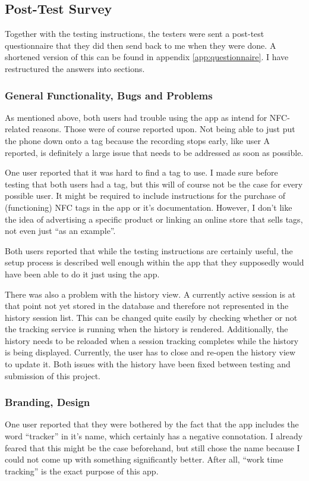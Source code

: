 \documentclass[conference]{IEEEtran}
\begin{document}
\subsection{Post-Test Survey}
Together with the testing instructions, the testers were sent a post-test questionnaire that they did then send back to me when they were done. A shortened version of this can be found in appendix \ref{app:questionnaire}. I have restructured the answers into sections.

\subsubsection{General Functionality, Bugs and Problems}
As mentioned above, both users had trouble using the app as intend for NFC-related reasons. Those were of course reported upon. Not being able to just put the phone down onto a tag because the recording stops early, like user A reported, is definitely a large issue that needs to be addressed as soon as possible.

One user reported that it was hard to find a tag to use. I made sure before testing that both users had a tag, but this will of course not be the case for every possible user. It might be required to include instructions for the purchase of (functioning) NFC tags in the app or it's documentation. However, I don't like the idea of advertising a specific product or linking an online store that sells tags, not even just ``as an example''.

Both users reported that while the testing instructions are certainly useful, the setup process is described well enough within the app that they supposedly would have been able to do it just using the app.

There was also a problem with the history view. A currently active session is at that point not yet stored in the database and therefore not represented in the history session list. This can be changed quite easily by checking whether or not the tracking service is running when the history is rendered. Additionally, the history needs to be reloaded when a session tracking completes while the history is being displayed. Currently, the user has to close and re-open the history view to update it. Both issues with the history have been fixed between testing and submission of this project.

\subsubsection{Branding, Design}
One user reported that they were bothered by the fact that the app includes the word ``tracker'' in it's name, which certainly has a negative connotation. I already feared that this might be the case beforehand, but still chose the name because I could not come up with something significantly better. After all, ``work time tracking'' is the exact purpose of this app.
\end{document}
